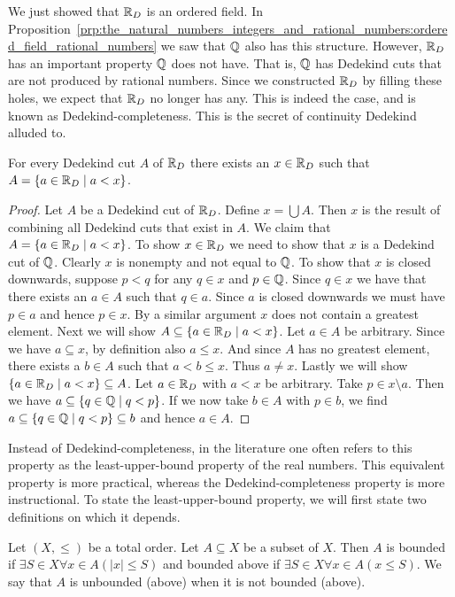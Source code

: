\documentclass[../main.tex]{subfiles}
\begin{document}
We just showed that $\mathbb{R}_D$ is an ordered field. In Proposition~\ref{prp:the_natural_numbers_integers_and_rational_numbers:ordered_field_rational_numbers} we saw that $\mathbb{Q}$ also has this structure. However, $\mathbb{R}_D$ has an important property $\mathbb{Q}$ does not have. That is, $\mathbb{Q}$ has Dedekind cuts that are not produced by rational numbers. Since we constructed $\mathbb{R}_D$ by filling these holes, we expect that $\mathbb{R}_D$ no longer has any. This is indeed the case, and is known as Dedekind-completeness. This is the secret of continuity Dedekind alluded to. 
\begin{proposition}\label{prp:the_real_numbers:dedekind_R_dedekind_complete}
    For every Dedekind cut $A$ of $\mathbb{R}_D$ there exists an $x\in\mathbb{R}_D$ such that $A=\{a\in\mathbb{R}_D\mid a<x\}$.
\end{proposition}
\begin{proof}
    Let $A$ be a Dedekind cut of $\mathbb{R}_D$. Define $x=\bigcup A$. Then $x$ is the result of combining all Dedekind cuts that exist in $A$. We claim that $A=\{a\in\mathbb{R}_D\mid a<x\}$. To show $x\in\mathbb{R}_D$ we need to show that $x$ is a Dedekind cut of $\mathbb{Q}$. Clearly $x$ is nonempty and not equal to $\mathbb{Q}$. To show that $x$ is closed downwards, suppose $p<q$ for any $q\in x$ and $p\in\mathbb{Q}$. Since $q\in x$ we have that there exists an $a\in A$ such that $q\in a$. Since $a$ is closed downwards we must have $p\in a$ and hence $p\in x$. By a similar argument $x$ does not contain a greatest element. Next we will show $A\subseteq\{a\in\mathbb{R}_D\mid a<x\}$. Let $a\in A$ be arbitrary. Since we have $a\subseteq x$, by definition also $a\leq x$. And since $A$ has no greatest element, there exists a $b\in A$ such that $a<b\leq x$. Thus $a\neq x$. Lastly we will show $\{a\in\mathbb{R}_D\mid a<x\}\subseteq A$. Let $a\in\mathbb{R}_D$ with $a<x$ be arbitrary. Take $p\in x\setminus a$. Then we have $a\subseteq\{q\in\mathbb{Q}\mid q<p\}$. If we now take $b\in A$ with $p\in b$, we find $a\subseteq\{q\in\mathbb{Q}\mid q<p\}\subseteq b$ and hence $a\in A$.
\end{proof}
Instead of Dedekind-completeness, in the literature one often refers to this property as the least-upper-bound property of the real numbers. This equivalent property is more practical, whereas the Dedekind-completeness property is more instructional. To state the least-upper-bound property, we will first state two definitions on which it depends.
\begin{definition}
    Let $(X,\leq)$ be a total order. Let $A\subseteq X$ be a subset of $X$. Then $A$ is bounded if $\exists S\in X\forall x\in A(\vert x\vert\leq S)$ and bounded above if $\exists S\in X\forall x\in A(x\leq S)$. We say that $A$ is unbounded (above) when it is not bounded (above).
\end{definition}
\end{document}
